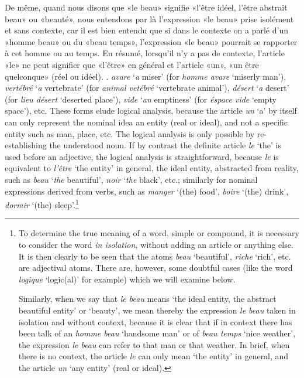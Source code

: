 \begin{sloppypar}
{{    De même, quand nous disons que «le beau» signifie «l’être idéel,
    l’être abstrait beau» ou «beauté», nous entendons par là
    l’expression «le beau» prise isolément et sans contexte, car il
    est bien entendu que si dans le contexte on a parlé d’un «homme
    beau» ou du «beau temps», l’expression «le beau» pourrait se
    rapporter à cet homme ou au temps. En résumé, lorsqu’il n’y a pas
    de contexte, l’article «le» ne peut signifier que «l'être» en
    général et l’article «un», «un être quelconque» (réel ou
    idéel). }.  }%
{\noindent \emph{ avare} `\emph{a} miser' (for \emph{homme
    avare} `miserly man'), \emph{ vertébré} `\emph{a}
  vertebrate' (for \emph{animal vetébré} `vertebrate animal'),
  \emph{ désert} `\emph{a} desert' (for \emph{lieu désert}
  `deserted place'), \emph{ vide} `\emph{an} emptiness' (for
  \emph{éspace vide} `empty space'), etc. These forms elude logical
  analysis, because the article \emph{un} `a' by itself can only
  represent the nominal idea \og an entity\fg{} (real or ideal), and
  not a specific entity such as \og man,\fg{} \og place,\fg{} etc. The
  logical analysis is only possible by re-establishing the understood
  noun. If by contrast the definite article \emph{le} `the' is used
  before an adjective, the logical analysis is straightforward,
  because \emph{le} is equivalent to \emph{l'être} `the entity' in
  general, the ideal entity, abstracted from reality, such as
  \emph{ beau} `\emph{the} beautiful', \emph{ noir}
  `\emph{the} black', etc.; similarly for nominal expressions derived
  from verbs, such as \emph{ manger} `(the) food',
  \emph{ boire} `(the) drink', \emph{ dormir} `(the)
  sleep'.\footnote{To determine the true meaning of a word, simple or
    compound, it is necessary to consider the word \emph{in
      isolation,} without adding an article or anything else. It is
    then clearly to be seen that the atoms \emph{beau} `beautiful',
    \emph{riche} `rich', etc. are adjectival atoms. There are,
    however, some doubtful cases (like the word \emph{logique}
    `logic(al)' for example) which we will examine below.

    Similarly, when we say that \emph{le beau} means `the ideal
    entity, the abstract beautiful entity' or `beauty', we mean
    thereby the expression \emph{le beau} taken in isolation and
    without context, because it is clear that if in context there has
    been talk of an \emph{homme beau} `handsome man' or of \emph{beau
      temps} `nice weather', the expression \emph{le beau} can refer
    to that man or that weather. In brief, when there is no context,
    the article \emph{le} can only mean `the entity' in general, and
    the article \emph{un} `any entity' (real or ideal).}  }


\end{sloppypar}
